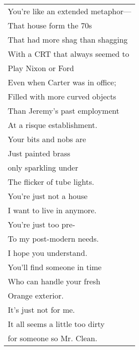 \documentclass{article}
\begin{document}
\begin{center}
\begin{tabular}{l}
You're like an extended metaphor--- \\
That house form the 70s \\
That had more shag than shagging \\
With a CRT that always seemed to \\
Play Nixon or Ford \\
Even when Carter was in office; \\
Filled with more curved objects \\
Than Jeremy's past employment \\
At a risque establishment. \\
Your bits and nobs are \\
Just painted brass \\
only sparkling under \\
The flicker of tube lights. \\
You're just not a house \\
I want to live in anymore. \\
You're just too pre- \\
To my post-modern needs. \\
I hope you understand. \\
You'll find someone in time \\
Who can handle your fresh \\
Orange exterior. \\
It's just not for me. \\
It all seems a little too dirty \\
for someone so Mr. Clean. \\
\end{tabular}
\end{center}
\end{document}
